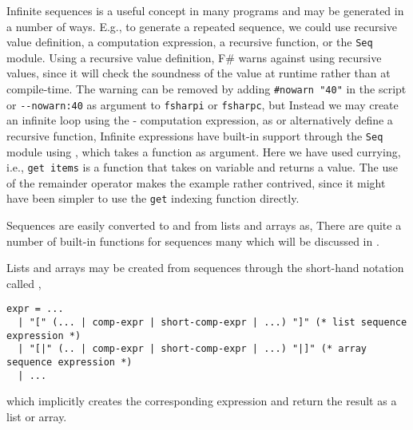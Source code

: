 \documentclass[fsharpnotes.tex]{subfiles}
\begin{document}
Infinite sequences is a useful concept in many programs and may be generated in a number of ways. E.g., to generate a repeated sequence, we could use recursive value definition, a computation expression, a recursive function, or the \lstinline!Seq! module. Using a recursive value definition,
%
%
F\# warns against using recursive values, since it will check the soundness of the value at runtime rather than at compile-time. The warning can be removed by adding \lstinline!#nowarn "40"! in the script or \lstinline!--nowarn:40! as argument to \lstinline[language=console]!fsharpi! or \lstinline[language=console]!fsharpc!, but  Instead we may create an infinite loop using the - computation expression, as
%
%
or alternatively define a recursive function,
%
%
Infinite expressions have built-in support through the \lstinline!Seq! module using ,
%
%
which takes a function as argument. Here we have used currying, i.e., \lstinline!get items! is a function that takes on variable and returns a value. The use of the remainder operator makes the example rather contrived, since it might have been simpler to use the \lstinline!get! indexing function directly.

Sequences are easily converted to and from lists and arrays as,
%
%
There are quite a number of built-in functions for sequences many which will be discussed in .
 
Lists and arrays may be created from sequences through the short-hand notation called ,
\begin{lstlisting}[language=ebnf]
expr = ... 
  | "[" (... | comp-expr | short-comp-expr | ...) "]" (* list sequence expression *)
  | "[|" (.. | comp-expr | short-comp-expr | ...) "|]" (* array sequence expression *)
  | ...
\end{lstlisting}
which implicitly creates the corresponding expression and return the result as a list or array.
\end{document}
